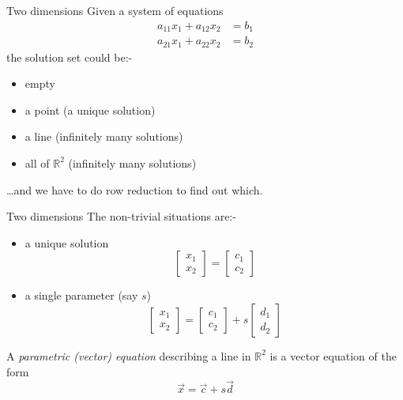 \documentclass{beamer}
\begin{document}
\begin{frame}{Two dimensions}
  Given a system of equations
  \begin{align*}
    a_{11}x_1+a_{12}x_2 & = b_1\\
    a_{21}x_1+a_{22}x_2 & = b_2
  \end{align*}
  the solution set could be:-
  \begin{itemize}
  \item empty
  \item a point (a unique solution)
  \item a line (infinitely many solutions)
  \item all of $\mathbb R^2$ (infinitely many solutions)
  \end{itemize}
  \dots and we have to do row reduction to find out which.
\end{frame}

\begin{frame}{Two dimensions}
  The non-trivial situations are:-
  \begin{itemize}
  \item a unique solution
    \begin{equation*}
      \left[
	\begin{array}{c}
          x_1\\
          x_2
	\end{array}
      \right]=
      \left[
	\begin{array}{c}
          c_1\\
          c_2
	\end{array}
      \right]
    \end{equation*}
  \item a single parameter (say $s$)
    \begin{equation*}
      \left[
	\begin{array}{c}
          x_1\\
          x_2
	\end{array}
      \right] = \left[
	\begin{array}{c}
          c_1\\
          c_2
	\end{array}
      \right]+s \left[
	\begin{array}{c}
          d_1\\
          d_2
	\end{array}
      \right]
    \end{equation*}
  \end{itemize}
  \begin{definition}
    A \emph{parametric (vector) equation} describing a line in $\mathbb R^2$ is a vector equation of the form
    \begin{equation*}
      \vec{x} = \vec{c}+s\vec{d}
    \end{equation*}
  \end{definition}
\end{frame}
\end{document}
